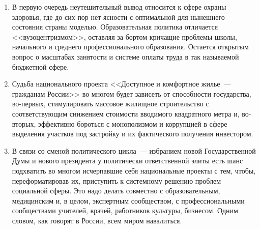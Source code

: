 \documentclass[article, 12pt, russian, oneside]{ncc}
\begin{document}
\begin{enumerate}
\item В первую очередь неутешительный вывод относится к сфере охраны
  здоровья, где до сих пор нет ясности с оптимальной для нынешнего
  состояния страны моделью. Образовательная политика отличается
  <<вузоцентризмом>>, оставляя за бортом кричащие проблемы школы,
  начального и среднего профессионального образования. Остается
  открытым вопрос о масштабах занятости и системе оплаты труда в так
  называемой бюджетной сфере.

\item Судьба национального проекта <<Доступное и комфортное жилье~---
  гражданам России>> во многом будет зависеть от способности
  государства, во-первых, стимулировать массовое жилищное
  строительство с соответствующим снижением стоимости вводимого
  квадратного метра и, во-вторых, эффективно бороться с монополизмом и
  коррупцией в сфере выделения участков под застройку и их
  фактического получения инвестором.

\item В связи со сменой политического цикла~--- избранием новой
  Государственной Думы и нового президента у политически ответственной
  элиты есть шанс подхватить во многом исчерпавшие себя национальные
  проекты с тем, чтобы, переформатировав их, приступить к системному
  решению проблем социальной сферы. Это надо делать совместно с
  образовательным, медицинским и, в целом, экспертным сообществом, с
  профессиональными сообществами учителей, врачей, работников
  культуры, бизнесом. Одним словом, как говорят в России, всем миром
  навалиться.
\end{enumerate}


\end{document}
